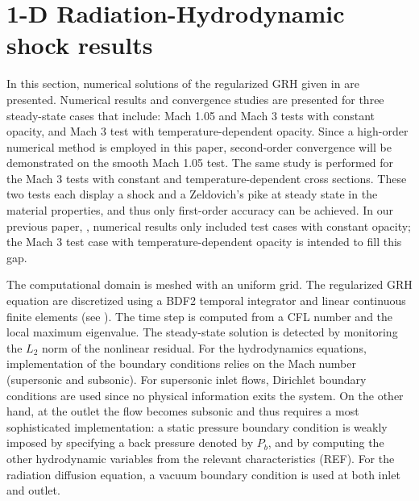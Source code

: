\documentclass[times,doublespace]{fldauth}%
\begin{document}
\section{1-D Radiation-Hydrodynamic shock results}
\label{sec:num-rslt}
%
In this section, numerical solutions of the regularized GRH given in  are presented. Numerical results and convergence studies are presented for three steady-state cases that include: Mach 1.05 and Mach 3 tests with constant opacity, and Mach 3 test with temperature-dependent opacity. Since a high-order numerical method is employed in this paper, second-order convergence will be demonstrated on the smooth Mach 1.05 test. The same study is performed for the Mach 3 tests with constant and temperature-dependent cross sections. These two tests each display a shock and a Zeldovich's pike at steady state in the material properties, and thus only first-order accuracy can be achieved. In our previous paper, \cite{our_jcp_radhy_paper}, numerical results only included test cases with constant opacity; the Mach 3 test case with temperature-dependent opacity is intended to fill this gap.

The computational domain is meshed with an uniform grid. The regularized GRH equation are discretized using a BDF2 temporal integrator and linear continuous finite elements (see ). 
The time step is computed from a CFL number and the local maximum eigenvalue. The steady-state solution is detected by monitoring the $L_2$ norm of the nonlinear residual. 
For the hydrodynamics equations, implementation of the boundary conditions relies on the Mach number (supersonic and subsonic). For supersonic inlet flows, Dirichlet boundary conditions are used
since no physical information exits the system. On the other hand, at the outlet the flow becomes subsonic and thus requires a most sophisticated implementation: a static 
pressure boundary condition is weakly imposed by specifying a back pressure denoted by $P_b$, and by computing the other hydrodynamic variables from the relevant characteristics (REF). 
For the radiation diffusion equation, a vacuum boundary condition is used at both inlet and outlet. 
\end{document}
